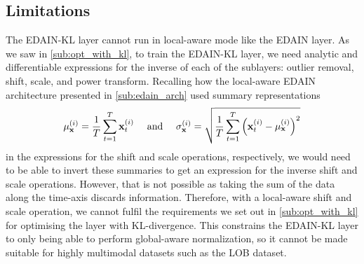 \documentclass{statsmsc}
\begin{document}
{%

\subsection{Limitations}%
\label{sub:Limitations}

The \ac{EDAIN-KL} layer cannot run in local-aware mode like the \ac{EDAIN} layer.
As we saw in \cref{sub:opt_with_kl}, to train the \ac{EDAIN-KL} layer, we need analytic and
differentiable expressions for the inverse of each of the sublayers: outlier removal, shift,
scale, and power transform. Recalling how the local-aware \ac{EDAIN} architecture presented
in \cref{sub:edain_arch} used summary representations
\begin{equation}
    \mu_{\mathbf{x}}^{(i)}=\frac{1}{T} \sum^{T}_{t=1} \mathbf{x}^{(i)}_t  \quad\textrm{ and }\quad
    \sigma_{\mathbf{x}}^{(i)}=\sqrt{\frac{1}{T}  \sum^{T}_{t=1} \left(\mathbf{x}^{(i)}_t- \mu_{\mathbf{x}}^{(i)} \right)^2}
\end{equation}
in the expressions for the shift and scale operations, respectively, we would need to be able to
invert these summaries to get an expression for the inverse shift and scale operations. However,
that is not possible as taking the sum of the data along the time-axis discards information.
Therefore, with a local-aware shift and scale operation, we cannot fulfil the requirements
we set out in \cref{sub:opt_with_kl} for optimising the layer with \ac{KL-divergence}.
This constrains the \ac{EDAIN-KL} layer to only being able to perform global-aware normalization,
so it cannot be made suitable for highly multimodal datasets such as the \ac{LOB} dataset.

%

}
\end{document}
